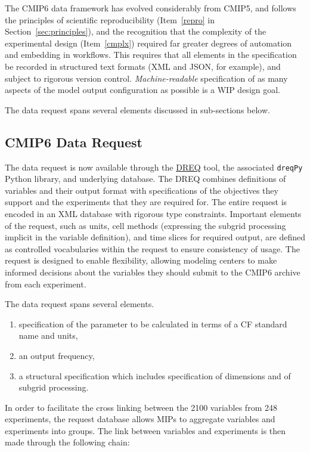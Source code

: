 \documentclass[gmd,manuscript]{copernicus}
\newcommand{\pipref}[1] {\citep{ref:#1}}
\newcommand{\secref}[1] {\mbox{Section  \ref{sec:#1}}}
\begin{document}
The CMIP6 data framework has evolved considerably from CMIP5, and
follows the principles of scientific reproducibility (Item~\ref{repro}
in \secref{principles}), and the recognition that the complexity of
the experimental design (Item~\ref{cmplx}) required far greater
degrees of automation and embedding in workflows. This requires that 
all elements in the specification be recorded in structured text
formats (XML and JSON, for example), and subject to rigorous version
control. \emph{Machine-readable} specification of as many aspects of
the model output configuration as possible is a WIP design goal.

The data request spans several elements discussed in sub-sections
below.

\subsection{CMIP6 Data Request}
\label{sec:data-request}

The data request \pipref{juckesetal2015} is now available
through the \href{https://goo.gl/iNBQ9m}{DREQ} tool, the associated
\texttt{dreqPy} Python library, and underlying
database. The DREQ combines definitions of variables and their output
format with specifications of the objectives they support and the
experiments that they are required for. The entire request is encoded
in an XML database with rigorous type constraints. Important elements
of the request, such as units, cell methods (expressing the subgrid
processing implicit in the variable definition), and time slices for
required output, are defined as controlled vocabularies within the
request to ensure consistency of usage. The request is designed to
enable flexibility, allowing modeling centers to make informed
decisions about the variables they should submit to the CMIP6 archive
from each experiment.

The data request spans several elements.

\begin{enumerate}
\item specification of the parameter to be calculated in terms of a CF
  standard name and units,
\item an output frequency,
\item a structural specification which includes specification of
  dimensions and of subgrid processing.
\end{enumerate}

In order to facilitate the cross linking between the 2100 variables
from 248 experiments, the request database allows MIPs to aggregate
variables and experiments into groups. The link between variables and
experiments is then made through the following chain:
\end{document}
